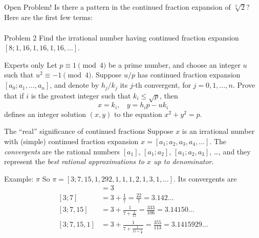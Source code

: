 \documentclass[serif]{beamer}
\begin{document}
\begin{frame}{Open Problem!}
    Is there a pattern in the continued fraction expansion of $\sqrt[3]{2}$? Here are the first few terms:
    \begin{multline*}
        [1;3,1,5,1,1,4,1,1,8,1,14,1,10,2,1,4,12, 2,3,2,1,3,4,1,1, 
        \\2,14,3,12,1,15,3,1,4,
        534,1,1,5,1,1,\dots]
    \end{multline*}
\end{frame}

\begin{frame}{Problem 2}
    Find the irrational number having continued fraction expansion $[8;1,16,1,16,1,16,\dots]$.
    
\end{frame}


\begin{frame}{Experts only}
Let $p\equiv 1 \pmod{4}$ be a prime number, and choose an integer $u$ such that $u^2\equiv -1 \pmod{4}$. Suppose $u/p$ has continued fraction expansion $[a_0;a_1,\dots,a_n]$, and denote by $h_j/k_j$ its $j$-th convergent, for $j=0,1,\dots,n$. Prove that if $i$ is the greatest integer such that $k_i\leqslant \sqrt{p}$, then \[x=k_i,\ \ \ \ y=h_ip-uk_i\] defines an integer solution $(x,y)$ to the equation $x^2+y^2=p$.
\end{frame}

\begin{frame}{The ``real'' significance of continued fractions}
    Suppose $x$ is an irrational number with (simple) continued fraction expansion $x=[a_1;a_2,a_3,a_4,\dots]$. The \emph{convergents} are the rational numbers $[a_1]$, $[a_1;a_2]$, $[a_1;a_2,a_3]$, \dots, and they represent the \emph{best rational approximations to $x$ up to denominator}.
\end{frame}

\begin{frame}{Example: $\pi$}
    So $\pi=[3;7,15,1,292,1,1,1,2,1,3,1,\dots]$. Its convergents are 
    \begin{align*}
        [3] &= 3 \\
        [3;7] &= 3+\frac{1}{7}=\frac{22}{7} =3.142\dots \\
        [3;7,15] &= 3 + \frac{1}{7+\frac{1}{15}}=\frac{333}{106}=3.14150\dots \\
        [3;7,15,1] &= 3 + \frac{1}{7+\frac{1}{15+\frac{1}{1}}}=\frac{355}{113}=3.1415929\dots
    \end{align*}
\end{frame}
\end{document}

